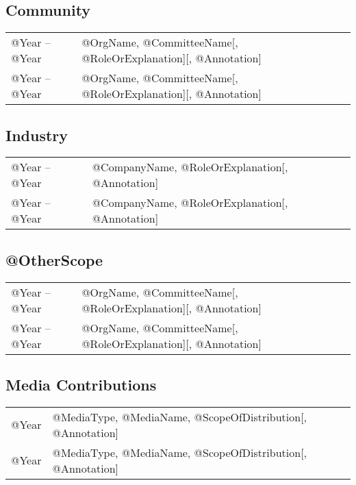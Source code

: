 \documentclass[10pt]{article}
\begin{document}
\begin{IOWA ONLY}
\subsection*{Community}

\begin{tabular}{l@{\quad\ }p{34em}} 
 @Year -- @Year 
 & @OrgName, @CommitteeName[, @RoleOrExplanation][, @Annotation]
 \\[.5ex]
 @Year -- @Year 
 & @OrgName, @CommitteeName[, @RoleOrExplanation][, @Annotation]
\end{tabular}

\subsection*{Industry}

\begin{tabular}{l@{\quad\ }p{34em}} 
 @Year -- @Year 
 & @CompanyName, @RoleOrExplanation[, @Annotation]
 \\[.5ex]
 @Year -- @Year 
 & @CompanyName, @RoleOrExplanation[, @Annotation]
\end{tabular}

\subsection*{@OtherScope}

\begin{tabular}{l@{\quad\ }p{34em}} 
 @Year -- @Year 
 & @OrgName, @CommitteeName[, @RoleOrExplanation][, @Annotation]
 \\[.5ex]
 @Year -- @Year 
 & @OrgName, @CommitteeName[, @RoleOrExplanation][, @Annotation]
\end{tabular}

\subsection*{Media Contributions}

\begin{tabular}{l@{\quad\ }p{34em}} 
 @Year  & @MediaType, @MediaName, @ScopeOfDistribution[, @Annotation]
 \\[.5ex]
 @Year  & @MediaType, @MediaName, @ScopeOfDistribution[, @Annotation]
\end{tabular}


\end{IOWA ONLY}
\end{document}
